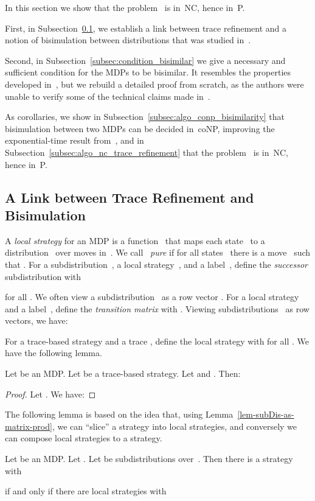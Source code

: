 In this section we show that the problem~ is in~{\sf NC}, hence in~{\sf P}.

First, in Subsection~\ref{subsec:link-trace-refinement-bisim}, we establish a link between trace refinement and a notion of bisimulation between distributions that was studied in~\cite{Jans}.

Second, in Subsection~\ref{subsec:condition_bisimilar} we give a necessary and sufficient condition for the MDPs to be bisimilar.
It resembles the properties developed in~\cite{Jans}, but we rebuild a detailed proof from scratch, as the authors were unable to verify some of the technical claims made in~\cite{Jans}.

As corollaries, we show in Subsection~\ref{subsec:algo_conp_bisimilarity} that bisimulation between two MDPs can be decided in~{\sf coNP}, improving the exponential-time result from~\cite{Jans},
and in Subsection~\ref{subsec:algo_nc_trace_refinement} that the problem~ is in~{\sf NC}, hence in~{\sf P}.

\subsection{A Link between Trace Refinement and Bisimulation}\label{subsec:link-trace-refinement-bisim}

A \emph{local strategy} for an MDP  is a function~
that maps each state~ to a distribution~ over moves in~.
We call~ \emph{pure} if for all states~ there is a move~ such that .
For a subdistribution~, a local strategy~, and a label~,
define the \emph{successor} subdistribution  with

for all .
We often view a subdistribution~ as a row vector .
For a local strategy  and a label~,
define the \emph{transition matrix}  with
.
Viewing subdistributions~ as row vectors, we have:


For a trace-based strategy  and a trace ,
define the local strategy  with  for all .
We have the following lemma.
\begin{lem}\label{lem-subDis-as-matrix-prod}
Let  be an MDP\@.
Let  be a trace-based strategy.
Let  and .
Then:

\end{lem}
\begin{proof}
Let .
We have:

\end{proof}

The following lemma is based on the idea that, using Lemma~\ref{lem-subDis-as-matrix-prod}, we can ``slice'' a strategy into local strategies, and conversely we can compose local strategies to a strategy.
\begin{lem}\label{lem-link-trace-local}
Let  be an MDP\@.
Let .
Let  be subdistributions over~.
Then there is a strategy  with

if and only if there are local strategies  with

\end{lem}

